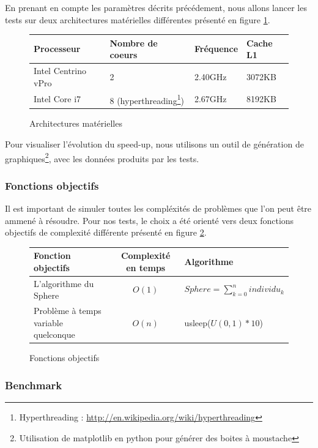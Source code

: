 En prenant en compte les paramètres décrits précédement, nous allons lancer les tests sur deux architectures matérielles différentes présenté en figure \ref{fig:architectures}.\\

\begin{figure}[here]
  \centering
  \begin{tabular}{ | l | l | l | l |}
    \hline
    \textbf{Processeur} & \textbf{Nombre de coeurs} & \textbf{Fréquence} & \textbf{Cache L1}\\\hline
    Intel Centrino vPro & 2 & 2.40GHz & 3072KB\\\hline
    Intel Core i7 & 8 (hyperthreading\footnote{Hyperthreading : \url{http://en.wikipedia.org/wiki/hyperthreading}}) & 2.67GHz & 8192KB\\\hline
  \end{tabular}
  \caption{Architectures matérielles}
  \label{fig:architectures}
\end{figure}

Pour visualiser l'évolution du speed-up, nous utilisons un outil de génération de graphiques\footnote{Utilisation de matplotlib en python pour générer des boites à moustache}, avec les données produits par les tests.

\subsubsection{Fonctions objectifs}

Il est important de simuler toutes les compléxités de problèmes que l'on peut être ammené à résoudre. Pour nos tests, le choix a été orienté vers deux fonctions objectifs de complexité différente présenté en figure \ref{fig:objectifs}.

\begin{figure}[here]
  \centering
  \begin{tabular}{ | l | c | l |}
    \hline
    \textbf{Fonction objectifs} & \textbf{Complexité en temps} & \textbf{Algorithme}\\\hline
    L'algorithme du Sphere & $O(1)$ & $Sphere = \sum_{k=0}^n individu_k$\\\hline
    Problème à temps variable quelconque & $O(n)$ & usleep($U(0,1) * 10$)\\\hline
  \end{tabular}
  \caption{Fonctions objectifs}
  \label{fig:objectifs}
\end{figure}

\subsubsection{Benchmark}

